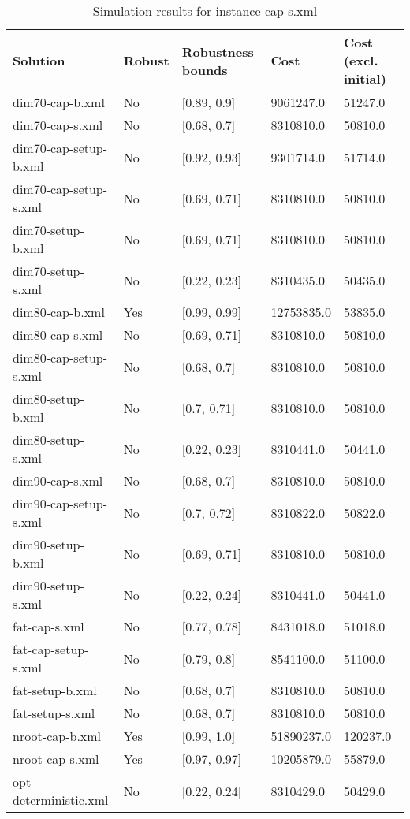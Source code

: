 \begin{table}[!hbp]
\label{tab:instance2_results}
\begin{tabular}{lllll}
\hline
Solution 	& Robust  	& Robustness bounds 	& Cost 	& Cost (excl. initial) \\
\hline
\hline
dim70-cap-b.xml 	& No 	&  [0.89, 0.9] 	& 9061247.0 	& 51247.0\\
dim70-cap-s.xml 	& No 	&  [0.68, 0.7] 	& 8310810.0 	& 50810.0\\
dim70-cap-setup-b.xml 	& No 	&  [0.92, 0.93] 	& 9301714.0 	& 51714.0\\
dim70-cap-setup-s.xml 	& No 	&  [0.69, 0.71] 	& 8310810.0 	& 50810.0\\
dim70-setup-b.xml 	& No 	&  [0.69, 0.71] 	& 8310810.0 	& 50810.0\\
dim70-setup-s.xml 	& No 	&  [0.22, 0.23] 	& 8310435.0 	& 50435.0\\
dim80-cap-b.xml 	& Yes 	&  [0.99, 0.99] 	& 12753835.0 	& 53835.0\\
dim80-cap-s.xml 	& No 	&  [0.69, 0.71] 	& 8310810.0 	& 50810.0\\
dim80-cap-setup-s.xml 	& No 	&  [0.68, 0.7] 	& 8310810.0 	& 50810.0\\
dim80-setup-b.xml 	& No 	&  [0.7, 0.71] 	& 8310810.0 	& 50810.0\\
dim80-setup-s.xml 	& No 	&  [0.22, 0.23] 	& 8310441.0 	& 50441.0\\
dim90-cap-s.xml 	& No 	&  [0.68, 0.7] 	& 8310810.0 	& 50810.0\\
dim90-cap-setup-s.xml 	& No 	&  [0.7, 0.72] 	& 8310822.0 	& 50822.0\\
dim90-setup-b.xml 	& No 	&  [0.69, 0.71] 	& 8310810.0 	& 50810.0\\
dim90-setup-s.xml 	& No 	&  [0.22, 0.24] 	& 8310441.0 	& 50441.0\\
fat-cap-s.xml 	& No 	&  [0.77, 0.78] 	& 8431018.0 	& 51018.0\\
fat-cap-setup-s.xml 	& No 	&  [0.79, 0.8] 	& 8541100.0 	& 51100.0\\
fat-setup-b.xml 	& No 	&  [0.68, 0.7] 	& 8310810.0 	& 50810.0\\
fat-setup-s.xml 	& No 	&  [0.68, 0.7] 	& 8310810.0 	& 50810.0\\
nroot-cap-b.xml 	& Yes 	&  [0.99, 1.0] 	        & 51890237.0 	& 120237.0\\
nroot-cap-s.xml 	& Yes 	&  [0.97, 0.97] 	& 10205879.0 	& 55879.0\\
opt-deterministic.xml 	& No 	&  [0.22, 0.24] 	& 8310429.0 	& 50429.0\\
\hline
\end{tabular}
\caption{Simulation results for instance cap-s.xml}
\end{table}



